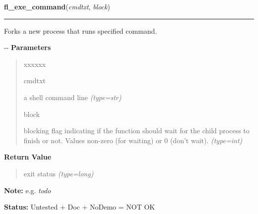 \hspace{.8\funcindent}\begin{boxedminipage}{\funcwidth}

    \raggedright \textbf{fl\_exe\_command}(\textit{cmdtxt}, \textit{block})

    \vspace{-1.5ex}

    \rule{\textwidth}{0.5\fboxrule}
\setlength{\parskip}{2ex}

Forks a new process that runs specified command.

-{}-
\setlength{\parskip}{1ex}
      \textbf{Parameters}
      \vspace{-1ex}

      \begin{quote}
        \begin{Ventry}{xxxxxx}

          \item[cmdtxt]


a shell command line
            {\it (type=str)}

          \item[block]


blocking flag indicating if the function should wait for the child
process to finish or not. Values non-zero (for waiting) or 0 (don't
wait).
            {\it (type=int)}

        \end{Ventry}

      \end{quote}

      \textbf{Return Value}
    \vspace{-1ex}

      \begin{quote}

exit status
      {\it (type=long)}

      \end{quote}

\textbf{Note:} 
e.g. \emph{todo}


\textbf{Status:} 
Untested + Doc + NoDemo = NOT OK


    \end{boxedminipage}

    \label{xformslib:flgoodies:fl_exe_command}

    \vspace{0.5ex}

